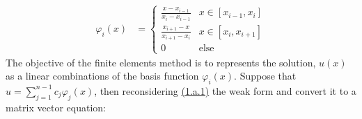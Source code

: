 \documentclass[]{article}
\begin{document}
        \begin{align*}\tag{1.a.2}\label{eqn:1.a.2}
            \varphi_i(x) &= 
            \begin{cases}
                \frac{x - x_{i - 1}}{x_i - x_{i - 1}} & x\in [x_{i - 1}, x_i]
                \\
                \frac{x_{i + 1} - x}{x_{i + 1} - x_{i}} & x\in [x_{i}, x_{i + 1}]
                \\
                0 & \text{else}
            \end{cases}
        \end{align*}
        The objective of the finite elements method is to represents the solution, $u(x)$ as a linear combinations of the basis function $\varphi_i(x)$. Suppose that $\hat{u} = \sum_{j = 1}^{n - 1}c_j \varphi_j(x)$, then reconsidering \hyperref[eqn:1.a.1]{(1.a.1)} the weak form and convert it to a matrix vector equation: 
        \begin{align*}\tag{1.a.3}\label{eqn:1.a.3}
        \end{align*}
\end{document}
